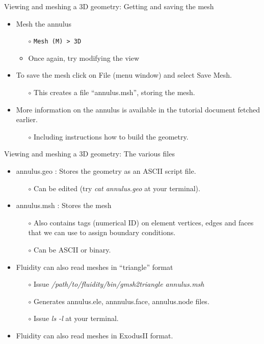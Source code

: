 \documentclass[t]{beamer}
\begin{document}
\begin{frame}{Viewing and meshing a 3D geometry: Getting and saving the mesh}
\begin{itemize}
\item Mesh the annulus
\begin{itemize}
  \item[$\circ$] \lstinline{Mesh (M) > 3D}
  \item[$\circ$] Once again, try modifying the view
\end{itemize}
\vspace{5pt}
\item To save the mesh click on File (menu window) and select Save Mesh.
\begin{itemize}
  \item[$\circ$] This creates a file ``annulus.msh'', storing the mesh.
\end{itemize}
\vspace{5pt}
\item More information on the annulus is available in the tutorial document fetched earlier.
\begin{itemize}
  \item[$\circ$] Including instructions how to build the geometry.
\end{itemize}
\end{itemize}
\end{frame}

\begin{frame}{Viewing and meshing a 3D geometry: The various files}
   \begin{itemize}
      \item annulus.geo : Stores the geometry as an ASCII script file.
      \begin{itemize}
         \item[$\circ$] Can be edited (try \emph{cat annulus.geo} at your terminal).
      \end{itemize}
      \item annulus.msh : Stores the mesh
      \begin{itemize}
         \item[$\circ$] Also contains tags (numerical ID) on element vertices, edges and faces that we can use to assign boundary conditions.
         \item[$\circ$] Can be ASCII or binary.
      \end{itemize}\vspace{20pt}
      \item Fluidity can also read meshes in ``triangle'' format
      \begin{itemize}
         \item[$\circ$] Issue \emph{/path/to/fluidity/bin/gmsh2triangle annulus.msh}
         \item[$\circ$] Generates annulus.ele, annnulus.face, annulus.node files.
         \item[$\circ$] Issue \emph{ls -l} at your terminal.
      \end{itemize}
      \item Fluidity can also read meshes in ExodusII format.
   \end{itemize}
\end{frame}
\end{document}
